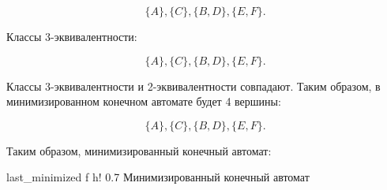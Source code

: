 \begin{equation*}
\{A\}, \{C\}, \{B, D\}, \{E, F\}.
\end{equation*}

Классы 3-эквивалентности:

\begin{equation*}
\{A\}, \{C\}, \{B, D\}, \{E, F\}.
\end{equation*}

Классы 3-эквивалентности и 2-эквивалентности совпадают. Таким образом, в минимизированном конечном автомате будет 4 вершины:

\begin{equation*}
\{A\}, \{C\}, \{B, D\}, \{E, F\}.
\end{equation*}

Таким образом, минимизированный конечный автомат:

    {last_minimized}
    {f}
    {h!}
    {0.7\textwidth}
    {Минимизированный конечный автомат}